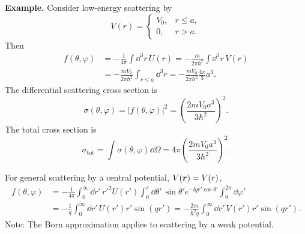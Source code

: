 \textbf{Example.} Consider low-energy scattering by
\begin{equation}
V(r)=\begin{cases}V_0,&r\le a,\\0,&r>a.\end{cases}
\end{equation}
Then
\begin{equation}\begin{aligned}
f(\theta,\varphi)
&=-\frac1{4\pi}\int\dd^3r\,U(r)
=-\frac{m}{2\pi\hbar^2}\int\dd^3r\,V(r)\\
&=-\frac{mV_0}{2\pi\hbar^2}\int_{r\le a}\dd^3r
=-\frac{mV_0}{2\pi\hbar^2}\frac{4\pi}{3}a^3.
\end{aligned}\end{equation}
The differential scattering cross section is
\begin{equation}
\sigma(\theta,\varphi)=|f(\theta,\varphi)|^2
=\left(\frac{2mV_0a^3}{3\hbar^2}\right)^2.
\end{equation}
The total cross section is
\begin{equation}
\sigma_{\mathrm{tot}}=\int\sigma(\theta,\varphi)\dd\Omega
=4\pi\left(\frac{2mV_0a^3}{3\hbar^2}\right)^2.
\end{equation}

For general scattering by a central potential, $V(\bm{r})=V(r)$,
\begin{equation}\begin{aligned}
f(\theta,\varphi)
&=-\frac1{4\pi}\int_0^\infty\dd r'\,r'^2U(r')
\int_0^\pi\dd\theta'\,\sin\theta' e^{-\ii qr'\cos\theta'}
\int_0^{2\pi}\dd\varphi'\\
&=-\frac1q\int_0^\infty\dd r'\,U(r')r'\sin(qr')
=-\frac{2m}{\hbar^2q}\int_0^\infty\dd r'\,V(r')r'\sin(qr').
\end{aligned}\end{equation}
Note: The Born approximation applies to scattering by a weak potential.

